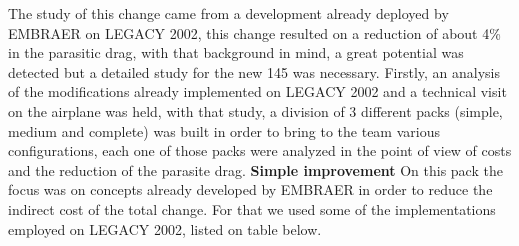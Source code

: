 The study of this change came from a development already deployed by EMBRAER on LEGACY 2002, this change resulted on a reduction of about 4\% in the parasitic drag, with that background in mind, a great potential was detected but a detailed study for the new 145 was necessary.
Firstly, an analysis of the modifications already implemented on LEGACY 2002 and a technical visit on the airplane was held, with that study, a division of 3 different packs (simple, medium and complete) was built in order to bring to the team various configurations, each one of those packs were analyzed in the point of view of costs and the reduction of the parasite drag.
\textbf{Simple improvement}
On this pack the focus was on concepts already developed by EMBRAER in order to reduce the indirect cost of the total change. For that we used some of the implementations employed on LEGACY 2002, listed on table below.

